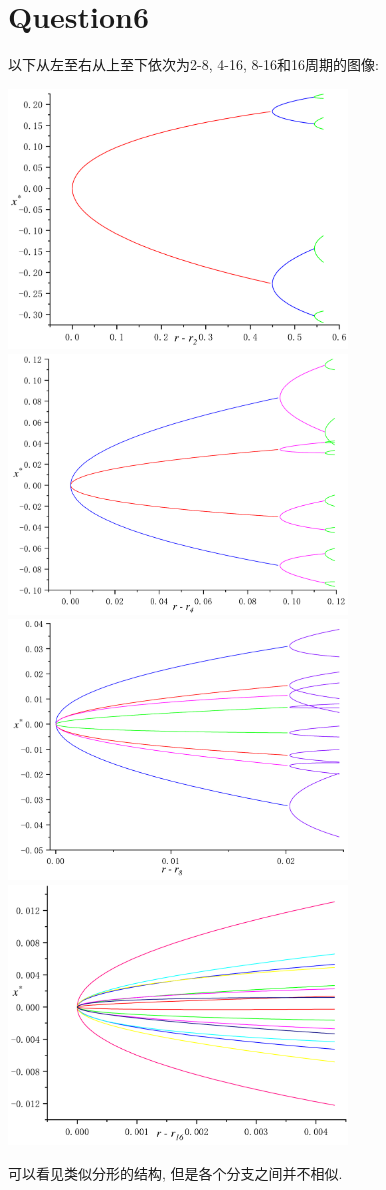 \documentclass[UTF8]{ctexart}
\begin{document}
    \section{Question6}
        \indent 以下从左至右从上至下依次为2-8, 4-16, 8-16和16周期的图像:
        \begin{center}
            \includegraphics[width=9cm]{t2-8.pdf}
            \includegraphics[width=9cm]{t4-16.pdf}
            \includegraphics[width=9cm]{t8-16.pdf}
            \includegraphics[width=9cm]{t16.pdf}
        \end{center}
        可以看见类似分形的结构, 但是各个分支之间并不相似.
\end{document}

